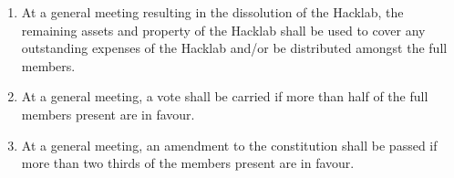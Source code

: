 \documentclass{article}
\begin{document}
\begin{enumerate}
\begin{enumerate}
      \item At a general meeting resulting in the dissolution of the
        Hacklab, the remaining assets and property of the Hacklab
        shall be used to cover any outstanding expenses of the Hacklab
        and/or be distributed amongst the full members.
      \item At a general meeting, a vote shall be carried if more than
        half of the full members present are in favour.
      \item At a general meeting, an amendment to the constitution
        shall be passed if more than two thirds of the members present
        are in favour.
      \end{enumerate}
      
\end{enumerate}
\end{document}
